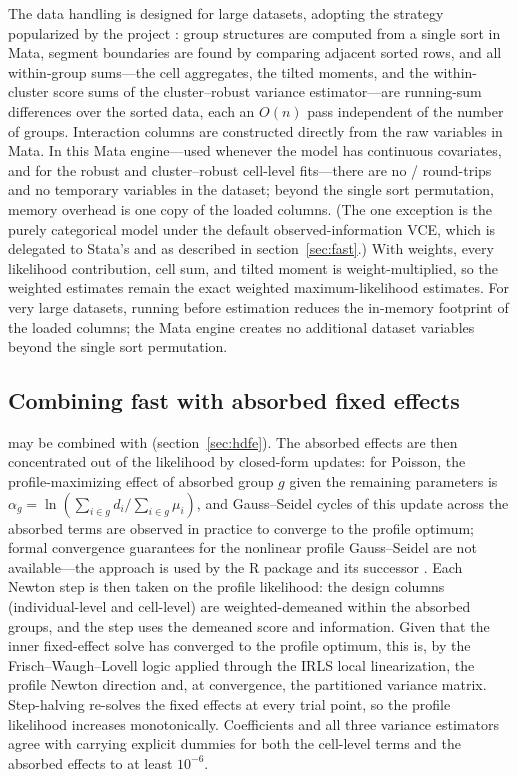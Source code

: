 \documentclass[12pt,a4paper]{article}
\begin{document}
The data handling is designed for large datasets, adopting the strategy
popularized by the  project \citep{correia2016ftools}:
group structures are computed from a single  sort in
Mata, segment boundaries are found by comparing adjacent sorted rows,
and all within-group sums---the cell aggregates, the tilted moments, and
the within-cluster score sums of the cluster--robust variance
estimator---are running-sum differences over the sorted data, each an
\(O(n)\) pass independent of the number of groups. Interaction columns
are constructed directly from the raw variables in Mata. In this Mata
engine---used whenever the model has continuous covariates, and for the
robust and cluster--robust cell-level fits---there are no
/ round-trips and no temporary variables
in the dataset; beyond the single sort permutation, memory overhead is
one copy of the loaded columns. (The one exception is the purely
categorical model under the default observed-information VCE, which is
delegated to Stata's  and  as described
in section~\ref{sec:fast}.) With weights, every
likelihood contribution, cell sum, and tilted moment is
weight-multiplied, so the weighted estimates remain the exact weighted
maximum-likelihood estimates. For very large datasets, running
 before estimation reduces the in-memory footprint of
the loaded columns; the Mata engine creates no additional dataset
variables beyond the single sort permutation.

\subsection{Combining fast with absorbed fixed
effects}\label{combining-fast-with-absorbed-fixed-effects}

\label{sec:combo}

 may be combined with 
(section~\ref{sec:hdfe}). The absorbed effects are then
concentrated out of the likelihood by closed-form updates: for Poisson,
the profile-maximizing effect of absorbed group \(g\) given the
remaining parameters is
\(\alpha_g = \ln(\sum_{i \in g} d_i / \sum_{i \in g} \mu_i)\), and
Gauss--Seidel cycles of this update across the absorbed terms are
observed in practice to converge to the profile optimum; formal
convergence guarantees for the nonlinear profile Gauss--Seidel are not
available---the approach is used by the R package 
\citep{berge2018} and its successor . Each Newton step is
then taken on the profile likelihood: the design columns
(individual-level and cell-level) are weighted-demeaned within the
absorbed groups, and the step uses the demeaned score and information.
Given that the inner fixed-effect solve has converged to the profile
optimum, this is, by the Frisch--Waugh--Lovell logic applied through the
IRLS local linearization, the profile Newton direction and, at
convergence, the partitioned variance matrix. Step-halving re-solves the
fixed effects at every trial point, so the profile likelihood increases
monotonically. Coefficients and all three variance estimators agree with
 carrying explicit dummies for both the cell-level terms
and the absorbed effects to at least \(10^{-6}\).
\end{document}
